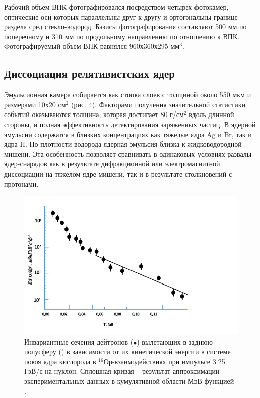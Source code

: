 \documentclass[fontsize=14pt]{scrarticle}
\begin{document}
Рабочий объем ВПК  фотографировался посредством четырех фотокамер, оптические оси которых  параллельны друг к другу  и  ортогональны границе   раздела   сред стекло-водород. Базисы фотографирования составляют 500 мм по поперечному и 310 мм по продольному направлению по отношению к ВПК. Фотографируемый объем ВПК равнялся 960х360х295 мм$^{3}$.


\subsection{Диссоциация релятивистских ядер}
\hspace{0.6cm}
Эмульсионная камера собирается как стопка слоев с толщиной около 550 мкм и размерами 10х20 см$^{2}$ (рис. 4). Факторами получения значительной статистики событий оказываются толщина, которая достигает 80 г/см$^{2}$ вдоль длинной стороны, и полная эффективность детектирования заряженных частиц. В ядерной эмульсии содержатся в близких концентрациях как тяжелые ядра Ag и Br, так и ядра H. По плотности водорода ядерная эмульсия близка к жидководородной мишени. Эта особенность позволяет сравнивать в одинаковых условиях развалы ядер-снарядов как в результате дифракционной или электромагнитной диссоциации на тяжелом ядре-мишени, так и в результате столкновений с протонами. 


\begin{figure}[!ht]
\centerline{\includegraphics{picture5.png}}
\caption{Инвариантные сечения  дейтронов ($\bullet$) вылетающих в заднюю полусферу () в зависимости от их кинетической энергии в системе покоя ядра кислорода в $^{16}$Ор-взаимодействиях при импульсе 3.25 ГэВ/с на нуклон. Сплошная кривая – результат аппроксимации экспериментальных данных в кумулятивной области  МэВ функцией .}
\label{fig4}
\end{figure}
\end{document}
